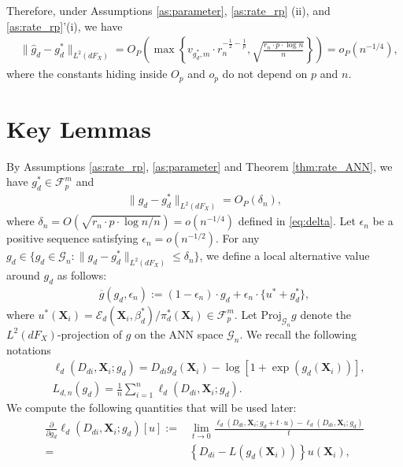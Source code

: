 \documentclass[11pt]{article}
\numberwithin{equation}{section}
\begin{document}
{	
	Therefore, under Assumptions \ref{as:parameter}, \ref{as:rate_rp} (ii), and \ref{as:rate_rp}'(i), we have 	\begin{align*}
		&\|\widehat{g}_d-g_d^*\|_{L^2(dF_X)}=O_P\left(\max\left\{v_{g_d^*,m}\cdot r_n^{-\frac{1}{2}-\frac{1}{p}},\sqrt{\frac{r_n\cdot p\cdot \log n}{n}}\right\}\right)=o_P\left(n^{-1/4}\right),
	\end{align*}
	where the constants hiding inside $O_p$ and $o_p$ do not depend on
	$p$ and $n$.}





\section{Key Lemmas} \label{app:lemma:projection}
By Assumptions \ref{as:rate_rp}, \ref{as:parameter} and Theorem \ref{thm:rate_ANN}, we have $g_d^*\in\mathcal{F}^{m}_p$ and
\begin{align*}
	\|\widehat{g}_d-{g}^*_d\|_{L^2(dF_X)}=O_P(\delta_n),
\end{align*}
where $\delta_n=O(\sqrt{r_n\cdot p\cdot \log n/n})=o(n^{-1/4})$ defined in \eqref{eq:delta}. Let $\epsilon_n$ be a positive sequence satisfying $\epsilon_n=o(n^{-1/2})$.
For any $g_d\in \{g_d\in\mathcal{G}_n:\|g_d-g_d^*\|_{L^2(dF_X)}\leq \delta_n \}$, we define a local alternative value around $g_d$ as follows:
\begin{align*}
	\overline{g}(g_d,\epsilon_n):=(1-\epsilon_n)\cdot g_d+\epsilon_n\cdot \{u^*+g_d^*\},
\end{align*}
where $u^*(\boldsymbol{X}_{i})=\mathcal{E}_d(\boldsymbol{X}_{i},\beta_d^*)/\pi_d^*(\boldsymbol{X}_i)\in \mathcal{F}_p^m$. Let $\text{Proj}_{\mathcal{G}_n}g$ denote the $L^2(dF_X)$-projection of $g$ on the ANN space $\mathcal{G}_n$. We recall the following notations
\begin{align*}
	&\ell_d(D_{di},\boldsymbol{X}_{i};g_d)=D_{di}g_d(\boldsymbol{X}_i)-\log\left[1+\exp(g_d(\boldsymbol{X}_i))\right],\\
	&L_{d,n}(g_d)=\frac{1}{n}\sum_{i=1}^n\ell_d(D_{di},\boldsymbol{X}_{i};g_d).
\end{align*}
We compute the following quantities that will be used later:
\begin{align*}
	\frac{\partial}{\partial g_d}\ell_d(D_{di},\boldsymbol{X}_{i};g_d)[u]:=&\lim_{t\to 0}\frac{\ell_d(D_{di},\boldsymbol{X}_{i};g_d+t\cdot u)-\ell_d(D_{di},\boldsymbol{X}_{i};g_d)}{t}\\
	=&\left\{D_{di}-L(g_d(\boldsymbol{X}_i))\right\} u(\boldsymbol{X}_{i}),\end{align*}
\end{document}
